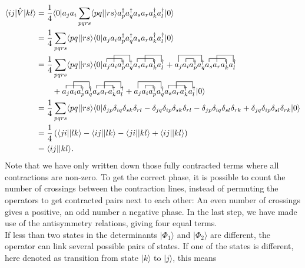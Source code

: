 \begin{align*}
\langle i j | \hat{V}| k l\rangle
&=\frac{1}{4}\langle 0 | a_j a_i \sum_{pqrs} \langle pq||rs\rangle \ad_p\ad_q a_s a_r\ad_k\ad_l|0\rangle\\
&= \frac{1}{4}\sum_{pqrs}\langle pq||rs\rangle\langle 0|a_ja_i \ad_p\ad_q a_s a_r \ad_k\ad_l|0\rangle\\
&= \frac{1}{4}\sum_{pqrs}\langle pq||rs\rangle \langle 0 | 
\contraction{}{a_j}{a_i}{\ad_p}
\contraction[2ex]{a_j}{a_i}{\ad_p}{\ad_q}
\contraction{a_ja_i\ad_p\ad_q}{a_s}{a_r}{\ad_k}
\contraction[2ex]{a_ja_i\ad_p\ad_qa_s}{a_r}{\ad_k}{\ad_l}
a_ja_i \ad_p\ad_q a_s a_r \ad_k\ad_l
+ \contraction[2ex]{}{a_j}{a_i\ad_p}{\ad_q}
\contraction{a_j}{a_i}{}{\ad_p}
\contraction{a_ja_i \ad_p\ad_q}{a_s}{a_r}{\ad_k}
\contraction[2ex]{a_ja_i \ad_p\ad_q a_s}{a_r}{\ad_k}{\ad_l}
a_ja_i \ad_p\ad_q a_s a_r \ad_k\ad_l\\
&\qquad+ \contraction{}{a_j}{a_i}{\ad_p}
\contraction[2ex]{a_j}{a_i}{\ad_p}{\ad_q}
\contraction{a_ja_i \ad_p\ad_q}{a_s}{a_r}{\ad_k}
\contraction[2ex]{a_ja_i \ad_p\ad_q a_s}{a_r}{\ad_k}{\ad_l}
a_ja_i \ad_p\ad_q a_s a_r \ad_k\ad_l
+ \contraction[2ex]{}{a_j}{a_i\ad_p}{\ad_q}
\contraction{a_j}{a_i}{}{\ad_p}
\contraction{a_ja_i\ad_p\ad_q}{a_s}{a_r}{\ad_k}
\contraction[2ex]{a_ja_i\ad_p\ad_qa_s}{a_r}{\ad_k}{\ad_l}
a_ja_i \ad_p\ad_q a_s a_r \ad_k\ad_l
|0\rangle \\
&= \frac{1}{4}\sum_{pqrs}\langle pq||rs\rangle \langle 0 | 
\delta_{jp}\delta_{iq}\delta_{sk}\delta_{rl} - \delta_{jq}\delta_{ip}\delta_{sk}\delta_{rl} - \delta_{jp}\delta_{iq}\delta_{sl}\delta_{rk} + \delta_{jq}\delta_{ip}\delta_{sl}\delta_{rk} |0\rangle\\
&=\frac{1}{4}\lb \langle ji||lk\rangle - \langle ij||lk\rangle - \langle ji||kl\rangle + \langle ij||kl\rangle\rb\\
&= \langle ij|| kl\rangle.
\end{align*}
Note that we have only written down those fully contracted terms where all contractions are non-zero. To get the correct phase, it is possible to count the number of crossings between the contraction lines, instead of permuting the operators to get contracted pairs next to each other: An even number of crossings gives a positive, an odd number a negative phase. In the last step, we have made use of the antisymmetry relations, giving four equal terms.\\
If less than two states in the determinants $|\Phi_1\rangle$ and $| \Phi_2\rangle$ are different, the operator can link several possible pairs of states. If one of the states is different, here denoted as transition from state $|k\rangle$ to $|j\rangle$, this means

